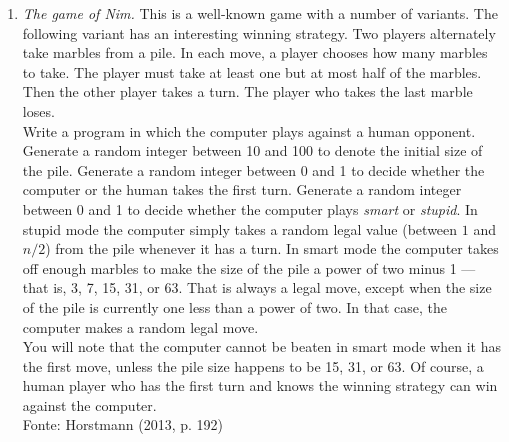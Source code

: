 \documentclass[onecolumn,a4paper,10pt]{report}
\newcommand{\+}{\, + \,}
\newcommand{\<}{\hspace*{-0.4cm}}
\begin{document}
\begin{enumerate}[1.]
\item \emph{The game of Nim.} This is a well-known game with a number of variants. The following variant has an interesting winning strategy. Two players alternately take
marbles from a pile. In each move, a player chooses how many marbles to take. The
player must take at least one but at most half of the marbles. Then the other player
takes a turn. The player who takes the last marble loses.\\
Write a program in which the computer plays against a human opponent. Generate a
random integer between 10 and 100 to denote the initial size of the pile. Generate a
random integer between 0 and 1 to decide whether the computer or the human takes
the first turn. Generate a random integer between 0 and 1 to decide whether the
computer plays \emph{smart} or \emph{stupid}. In stupid mode the computer simply takes a random
legal value (between $1$ and $n/2$) from the pile whenever it has a turn. In smart mode
the computer takes off enough marbles to make the size of the pile a power of two
minus 1 — that is, 3, 7, 15, 31, or 63. That is always a legal move, except when the size
of the pile is currently one less than a power of two. In that case, the computer makes a random legal move.\\
You will note that the computer cannot be beaten in smart mode when it has the first
move, unless the pile size happens to be 15, 31, or 63. Of course, a human player who
has the first turn and knows the winning strategy can win against the computer.\\
{\tiny Fonte: Horstmann (2013, p. 192)}

\end{enumerate}




\end{document}
